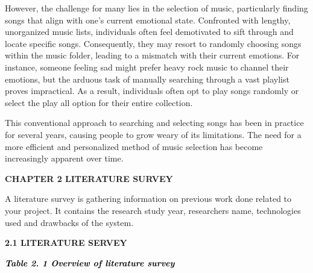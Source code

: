 \documentclass[a4paper]{article}
\begin{document}
However, the challenge for many lies in the selection of music, particularly finding songs that align with one's current
emotional state. Confronted with lengthy, unorganized music lists, individuals often feel demotivated to sift through
and locate specific songs. Consequently, they may resort to randomly choosing songs within the music folder, leading to
a mismatch with their current emotions. For instance, someone feeling sad might prefer heavy rock music to channel
their emotions, but the arduous task of manually searching through a vast playlist proves impractical. As a result,
individuals often opt to play songs randomly or select the {\textquotedbl}play all{\textquotedbl} option for their
entire collection.

This conventional approach to searching and selecting songs has been in practice for several years, causing people to
grow weary of its limitations. The need for a more efficient and personalized method of music selection has become
increasingly apparent over time.

\clearpage\setcounter{page}{1}\pagestyle{Convertedvii}
{\bfseries
\hypertarget{tyjcwt}{}CHAPTER 2 LITERATURE SURVEY }

A literature survey is gathering information on previous work done related to your project. It contains the research
study year, researchers name, technologies used and drawbacks of the system. 


\bigskip

{\bfseries
\hypertarget{3dy6vkm}{}2.1 LITERATURE SERVEY }

{\centering
\hypertarget{1t3h5sf}{}\textbf{\textit{\textcolor{black}{Table 2. 1 Overview of literature survey}}}
\par}
\end{document}
